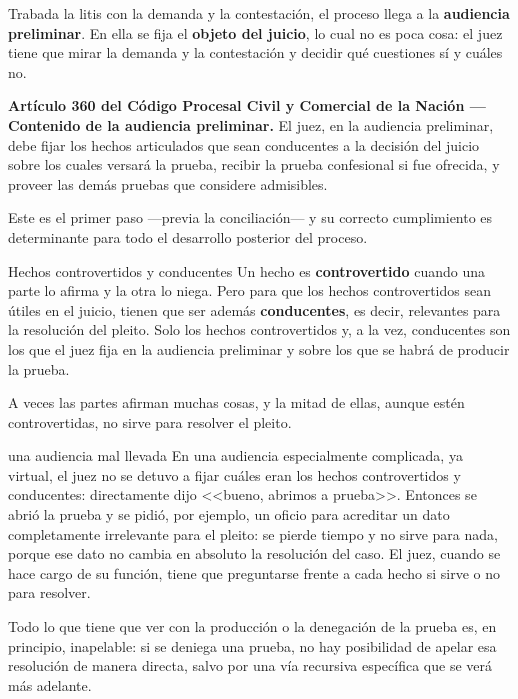 \documentclass[12pt,oneside]{book}
\begin{document}
Trabada la litis con la demanda y la contestación, el proceso llega a la \textbf{audiencia preliminar}. En ella se fija el \textbf{objeto del juicio}, lo cual no es poca cosa: el juez tiene que mirar la demanda y la contestación y decidir qué cuestiones sí y cuáles no.

\begin{important}
\textbf{Artículo 360 del Código Procesal Civil y Comercial de la Nación --- Contenido de la audiencia preliminar.}
El juez, en la audiencia preliminar, debe fijar los hechos articulados que sean conducentes a la decisión del juicio sobre los cuales versará la prueba, recibir la prueba confesional si fue ofrecida, y proveer las demás pruebas que considere admisibles.

Este es el primer paso ---previa la conciliación--- y su correcto cumplimiento es determinante para todo el desarrollo posterior del proceso.
\end{important}

\begin{definition}{Hechos controvertidos y conducentes}
Un hecho es \textbf{controvertido} cuando una parte lo afirma y la otra lo niega. Pero para que los hechos controvertidos sean útiles en el juicio, tienen que ser además \textbf{conducentes}, es decir, relevantes para la resolución del pleito. Solo los hechos controvertidos y, a la vez, conducentes son los que el juez fija en la audiencia preliminar y sobre los que se habrá de producir la prueba.
\end{definition}

A veces las partes afirman muchas cosas, y la mitad de ellas, aunque estén controvertidas, no sirve para resolver el pleito.

\begin{example}{una audiencia mal llevada}
En una audiencia especialmente complicada, ya virtual, el juez no se detuvo a fijar cuáles eran los hechos controvertidos y conducentes: directamente dijo <<bueno, abrimos a prueba>>. Entonces se abrió la prueba y se pidió, por ejemplo, un oficio para acreditar un dato completamente irrelevante para el pleito: se pierde tiempo y no sirve para nada, porque ese dato no cambia en absoluto la resolución del caso. El juez, cuando se hace cargo de su función, tiene que preguntarse frente a cada hecho si sirve o no para resolver.
\end{example}

\begin{note}
Todo lo que tiene que ver con la producción o la denegación de la prueba es, en principio, inapelable: si se deniega una prueba, no hay posibilidad de apelar esa resolución de manera directa, salvo por una vía recursiva específica que se verá más adelante.
\end{note}
\end{document}
